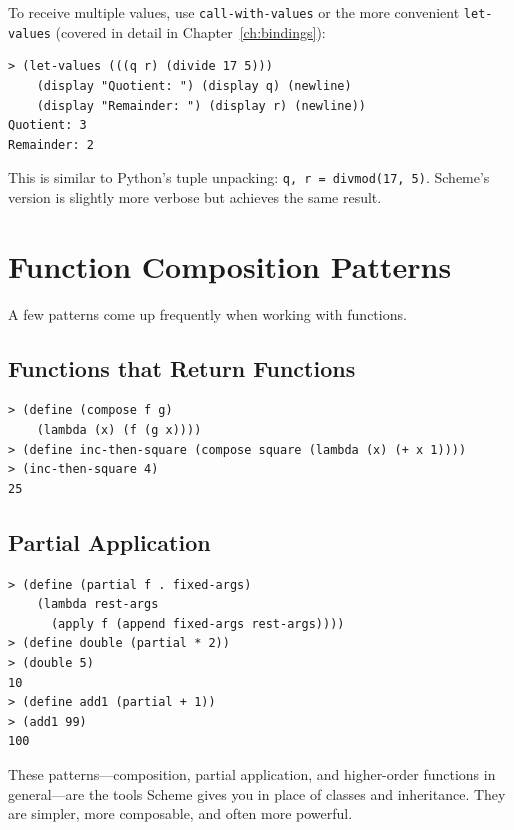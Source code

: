 To receive multiple values, use \texttt{call-with-values} or the more convenient \texttt{let-values} (covered in detail in Chapter~\ref{ch:bindings}):

\begin{lstlisting}[style=repl]
> (let-values (((q r) (divide 17 5)))
    (display "Quotient: ") (display q) (newline)
    (display "Remainder: ") (display r) (newline))
Quotient: 3
Remainder: 2
\end{lstlisting}

\begin{note}
This is similar to Python's tuple unpacking: \texttt{q, r = divmod(17, 5)}. Scheme's version is slightly more verbose but achieves the same result.
\end{note}

\section{Function Composition Patterns}

A few patterns come up frequently when working with functions.

\subsection{Functions that Return Functions}

\begin{lstlisting}[style=repl]
> (define (compose f g)
    (lambda (x) (f (g x))))
> (define inc-then-square (compose square (lambda (x) (+ x 1))))
> (inc-then-square 4)
25
\end{lstlisting}

\subsection{Partial Application}

\begin{lstlisting}[style=repl]
> (define (partial f . fixed-args)
    (lambda rest-args
      (apply f (append fixed-args rest-args))))
> (define double (partial * 2))
> (double 5)
10
> (define add1 (partial + 1))
> (add1 99)
100
\end{lstlisting}

These patterns---composition, partial application, and higher-order functions in general---are the tools Scheme gives you in place of classes and inheritance. They are simpler, more composable, and often more powerful.


